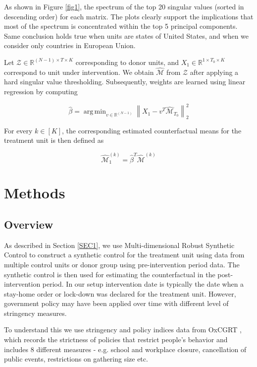 \documentclass[12pt]{article}
\DeclareMathOperator*{\argmin}{arg\,min}
\begin{document}
		As shown in Figure \ref{fig1}, the spectrum of the top 20 singular values (sorted in descending order) for each matrix. The plots clearly support the implications that most of the spectrum is concentrated within the top 5 principal components. Same conclusion holds true when units are states of United States, and when we consider only countries in European Union.\par
		
		Let $\mathcal{Z} \in \mathbb{R}^{(N-1) \times T \times K}$ corresponding to donor units, and $X_1 \in \mathbb{R}^{1 \times T_0 \times K}$ correspond to unit under intervention. We obtain $\hat{\mathcal{M}}$ from $\mathcal{Z}$ after applying a hard singular value thresholding. Subsequently, weights are learned using linear regression by computing
		
		\begin{equation*}
			\hat{\beta} = \argmin_{v \in \mathbb{R}^{(N-1)} } \left\| X_1 - v^T \hat{\mathcal{M}}_{T_0}\right\|^2_2
		\end{equation*}
        
        For every $k \in [K]$, the corresponding estimated counterfactual means for the treatment unit is then defined as
        
        \begin{equation*}
        \hat{\mathcal{M}}_1^{(k)} = \hat{\beta}^T \hat{\mathcal{M}}^{(k)}
        \end{equation*}
        
		\section{Methods}
		\label{SEC2}
		\subsection{Overview}
		As described in Section \ref{SEC1}, we use Multi-dimensional Robust Synthetic Control to construct a synthetic control for the treatment unit using data from multiple control units or donor group using pre-intervention period data.  The synthetic control is then used for estimating the counterfactual in the post-intervention period. In our setup intervention date is typically the date when a stay-home order or lock-down was declared for the treatment unit.  However, government policy may have been applied over time with different level of stringency measures. 
		
		To understand this we use stringency and policy indices data from OxCGRT \cite{HWP2020}, which records the strictness of policies that restrict people’s behavior and includes 8 different measures - e.g. school  and workplace closure, cancellation of public events, restrictions on gathering size etc. 
		
\end{document}
